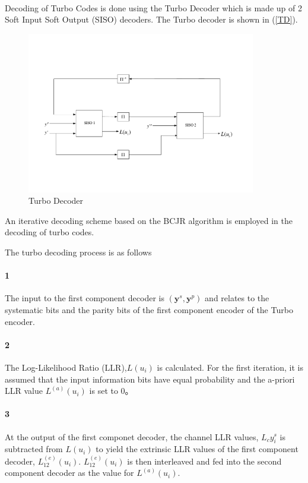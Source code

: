 \documentclass[20 pts]{article}
\begin{document}
\paragraph{}
Decoding of Turbo Codes is done using the Turbo Decoder which is made up of 2 Soft Input
Soft Output (SISO) decoders. The Turbo decoder is shown in (\ref{TD}).
\begin{figure}[h!]
\includegraphics[width=10cm]{D1.pdf}
\caption{Turbo Decoder}
\label{TD}
\label{図2}
\end{figure}
An iterative decoding scheme based on the BCJR algorithm
is employed in the decoding of turbo codes.




The turbo decoding process is as follows
\paragraph{1}
The input to the first component decoder is $(\boldsymbol{y}^s,\boldsymbol{y}^p)$ and relates
 to the systematic bits and the parity bits of the first component encoder of the Turbo encoder.
\paragraph{2}
The Log-Likelihood Ratio (LLR),$L(u_i)$ is calculated. For the first iteration, it is assumed 
that the input information bits have equal probability and the a-priori LLR value 
$L^{(a)}(u_i)$ is set to 0。
\paragraph{3}
At the output of the first componet decoder, the channel LLR values, $L_cy_i^s$ is subtracted from $L(u_i)$ to yield the extrinsic LLR values 
of the first component decoder, $L_{12}^{(e)}(u_i)$. $L_{12}^{(e)}(u_i)$ is then interleaved and fed into the second component decoder as the value for $L^{(a)}(u_i)$.
\end{document}

